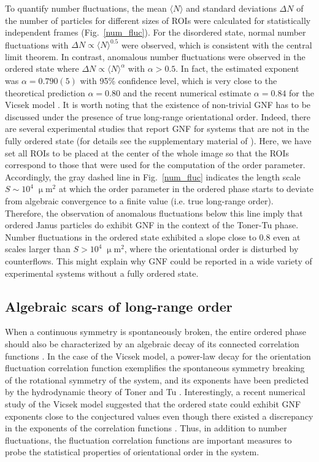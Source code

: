 \documentclass[%
 reprint,
 amsmath,amssymb,
 aps,
 floatfix
]{revtex4-2}
\newcommand{\mum}{\upmu\textrm{m}}
\begin{document}
To quantify number fluctuations, the mean $\langle N\rangle$ and standard deviations $\Delta N$ of the number of particles for different sizes of ROIs were calculated for statistically independent frames (Fig.~\ref{num_fluc}). 
For the disordered state, normal number fluctuations with $\Delta N \propto \langle N\rangle^{0.5}$ were observed, which is consistent with the central limit theorem.
In contrast, anomalous number fluctuations were observed in the ordered state where $\Delta N \propto \langle N\rangle^{\alpha}$ with $\alpha>0.5$. 
In fact, the estimated exponent was $\alpha=0.790(5)$ with 95\% confidence level, which is very close to the theoretical prediction $\alpha = 0.80$ \cite{tonertu95, tonertu98} and the recent numerical estimate $\alpha = 0.84$ for the Vicsek model \cite{benoit2019}. 
It is worth noting that the existence of non-trivial GNF has to be discussed under the presence of true long-range orientational order.
Indeed, there are several experimental studies that report GNF for systems that are not in the fully ordered state (for details see the supplementary material of \cite{nishiguchi2017}).
Here, we have set all ROIs to be placed at the center of the whole image so that the ROIs correspond to those that were used for the computation of the order parameter.
Accordingly, the gray dashed line in Fig.~\ref{num_fluc} indicates the length scale $S\sim 10^4\; \mum^2$ at which the order parameter in the ordered phase starts to deviate from algebraic convergence to a finite value (i.e. true long-range order).
Therefore, the observation of anomalous fluctuations below this line imply that ordered Janus particles do exhibit GNF in the context of the Toner-Tu phase.
Number fluctuations in the ordered state exhibited a slope close to $0.8$ even at scales larger than $S > 10^4 \;\mum^2$, where the orientational order is disturbed by counterflows.
This might explain why GNF could be reported in a wide variety of experimental systems without a fully ordered state.


\subsection{Algebraic scars of long-range order}
When a continuous symmetry is spontaneously broken, the entire ordered phase should also be characterized by an algebraic decay of its connected correlation functions \cite{ginelli2016}. 
In the case of the Vicsek model, a power-law decay for the orientation fluctuation correlation function exemplifies the spontaneous symmetry breaking of the rotational symmetry of the system, and its exponents have been predicted by the hydrodynamic theory of Toner and Tu \cite{tonertu95, tonertu98, toner2012}.
Interestingly, a recent numerical study of the Vicsek model suggested that the ordered state could exhibit GNF exponents close to the conjectured values even though there existed a discrepancy in the exponents of the correlation functions \cite{benoit2019}.
Thus, in addition to number fluctuations, the fluctuation correlation functions are important measures to probe the statistical properties of orientational order in the system.
\end{document}
